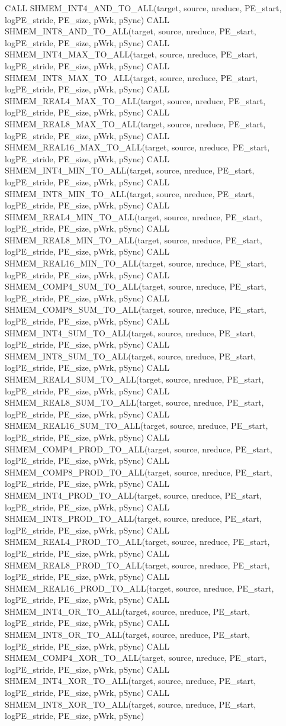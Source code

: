 CALL SHMEM_INT4_AND_TO_ALL(target, source, nreduce, PE_start, logPE_stride, PE_size, pWrk, pSync)
CALL SHMEM_INT8_AND_TO_ALL(target, source, nreduce, PE_start, logPE_stride, PE_size, pWrk, pSync)
CALL SHMEM_INT4_MAX_TO_ALL(target, source, nreduce, PE_start, logPE_stride, PE_size, pWrk, pSync)
CALL SHMEM_INT8_MAX_TO_ALL(target, source, nreduce, PE_start, logPE_stride, PE_size, pWrk, pSync)
CALL SHMEM_REAL4_MAX_TO_ALL(target, source, nreduce, PE_start, logPE_stride, PE_size, pWrk, pSync)
CALL SHMEM_REAL8_MAX_TO_ALL(target, source, nreduce, PE_start, logPE_stride, PE_size, pWrk, pSync)
CALL SHMEM_REAL16_MAX_TO_ALL(target, source, nreduce, PE_start, logPE_stride, PE_size, pWrk, pSync)
CALL SHMEM_INT4_MIN_TO_ALL(target, source, nreduce, PE_start, logPE_stride, PE_size, pWrk, pSync)
CALL SHMEM_INT8_MIN_TO_ALL(target, source, nreduce, PE_start, logPE_stride, PE_size, pWrk, pSync)
CALL SHMEM_REAL4_MIN_TO_ALL(target, source, nreduce, PE_start, logPE_stride, PE_size, pWrk, pSync)
CALL SHMEM_REAL8_MIN_TO_ALL(target, source, nreduce, PE_start, logPE_stride, PE_size, pWrk, pSync)
CALL SHMEM_REAL16_MIN_TO_ALL(target, source, nreduce, PE_start, logPE_stride, PE_size, pWrk, pSync)
CALL SHMEM_COMP4_SUM_TO_ALL(target, source, nreduce, PE_start, logPE_stride, PE_size, pWrk, pSync)
CALL SHMEM_COMP8_SUM_TO_ALL(target, source, nreduce, PE_start, logPE_stride, PE_size, pWrk, pSync)
CALL SHMEM_INT4_SUM_TO_ALL(target, source, nreduce, PE_start, logPE_stride, PE_size, pWrk, pSync)
CALL SHMEM_INT8_SUM_TO_ALL(target, source, nreduce, PE_start, logPE_stride, PE_size, pWrk, pSync)
CALL SHMEM_REAL4_SUM_TO_ALL(target, source, nreduce, PE_start, logPE_stride, PE_size, pWrk, pSync)
CALL SHMEM_REAL8_SUM_TO_ALL(target, source, nreduce, PE_start, logPE_stride, PE_size, pWrk, pSync)
CALL SHMEM_REAL16_SUM_TO_ALL(target, source, nreduce, PE_start, logPE_stride, PE_size, pWrk, pSync)
CALL SHMEM_COMP4_PROD_TO_ALL(target, source, nreduce, PE_start, logPE_stride, PE_size, pWrk, pSync)
CALL SHMEM_COMP8_PROD_TO_ALL(target, source, nreduce, PE_start, logPE_stride, PE_size, pWrk, pSync)
CALL SHMEM_INT4_PROD_TO_ALL(target, source, nreduce, PE_start, logPE_stride, PE_size, pWrk, pSync)
CALL SHMEM_INT8_PROD_TO_ALL(target, source, nreduce, PE_start, logPE_stride, PE_size, pWrk, pSync)
CALL SHMEM_REAL4_PROD_TO_ALL(target, source, nreduce, PE_start, logPE_stride, PE_size, pWrk, pSync)
CALL SHMEM_REAL8_PROD_TO_ALL(target, source, nreduce, PE_start, logPE_stride, PE_size, pWrk, pSync)
CALL SHMEM_REAL16_PROD_TO_ALL(target, source, nreduce, PE_start, logPE_stride, PE_size, pWrk, pSync)
CALL SHMEM_INT4_OR_TO_ALL(target, source, nreduce, PE_start, logPE_stride, PE_size, pWrk, pSync)
CALL SHMEM_INT8_OR_TO_ALL(target, source, nreduce, PE_start, logPE_stride, PE_size, pWrk, pSync)	
CALL SHMEM_COMP4_XOR_TO_ALL(target, source, nreduce, PE_start, logPE_stride, PE_size, pWrk, pSync)
CALL SHMEM_INT4_XOR_TO_ALL(target, source, nreduce, PE_start, logPE_stride, PE_size, pWrk, pSync)
CALL SHMEM_INT8_XOR_TO_ALL(target, source, nreduce, PE_start, logPE_stride, PE_size, pWrk, pSync) %

